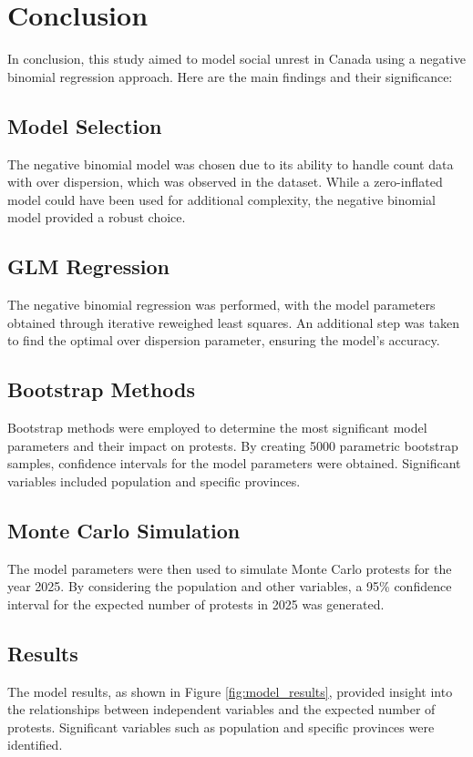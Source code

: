 \documentclass{article}
\begin{document}
\section{Conclusion}

In conclusion, this study aimed to model social unrest in Canada using a negative binomial regression approach. Here are the main findings and their significance:

\subsection{Model Selection}
The negative binomial model was chosen due to its ability to handle count data with over dispersion, which was observed in the dataset. While a zero-inflated model could have been used for additional complexity, the negative binomial model provided a robust choice.

\subsection{GLM Regression}
The negative binomial regression was performed, with the model parameters obtained through iterative reweighed least squares. An additional step was taken to find the optimal over dispersion parameter, ensuring the model's accuracy.

\subsection{Bootstrap Methods}
Bootstrap methods were employed to determine the most significant model parameters and their impact on protests. By creating 5000 parametric bootstrap samples, confidence intervals for the model parameters were obtained. Significant variables included population and specific provinces.

\subsection{Monte Carlo Simulation}
The model parameters were then used to simulate Monte Carlo protests for the year 2025. By considering the population and other variables, a 95\% confidence interval for the expected number of protests in 2025 was generated.

\subsection{Results}
The model results, as shown in Figure \ref{fig:model_results}, provided insight into the relationships between independent variables and the expected number of protests. Significant variables such as population and specific provinces were identified.
\end{document}
